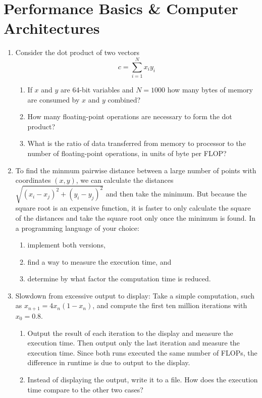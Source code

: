 \documentclass{article}
\begin{document}
\section{Performance Basics \& Computer Architectures}
\begin{enumerate}
\item  
Consider the dot product of two vectors
\[
c = \sum_{i=1}^N x_i y_i
\]
\begin{enumerate} \setlength{\itemsep}{0pt}
\item If $x$ and $y$ are 64-bit variables and $N=1000$ how many bytes of memory are consumed by $x$ and $y$ combined?
\item How many floating-point operations are necessary to form the dot product?
\item What is the ratio of data transferred from memory to processor to the number of floating-point operations, in units of byte per FLOP?
\end{enumerate}


\item
To find the minmum pairwise distance between a large number of points with coordinates $(x,y)$, we can calculate the distances $\sqrt{(x_i-x_j)^2 + (y_i-y_j)^2}$ and then take the minimum. But because the square root is an expensive function, it is faster to only calculate the square of the distances and take the square root only once the minimum is found.
In a programming language of your choice:
\begin{enumerate} \setlength{\itemsep}{0pt}
\item implement both versions,
\item find a way to measure the execution time, and
\item determine by what factor the computation time is reduced. 
\end{enumerate}


\item \label{prbl:slowdisplay}
Slowdown from excessive output to display:
Take a simple computation, such as $x_{n+1} = 4 x_n (1-x_n)$, and compute the first ten million iterations with $x_0=0.8$.
\vspace{-1em}\begin{enumerate} \setlength{\itemsep}{0pt}
\item Output the result of each iteration to the display and measure the execution time. Then output only the last iteration and measure the execution time. Since both runs executed the same number of FLOPs, the difference in runtime is due to output to the display.
\item Instead of displaying the output, write it to a file.
  How does the execution time compare to the other two cases?
\end{enumerate}



\end{enumerate}
\end{document}
